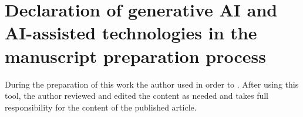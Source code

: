 \section*{Declaration of generative AI and AI-assisted technologies in the manuscript preparation process}
\label{sec:genai}

During the preparation of this work the author used  in order to . After using this tool, the author reviewed and edited the content as needed and takes full responsibility for the content of the published article.
